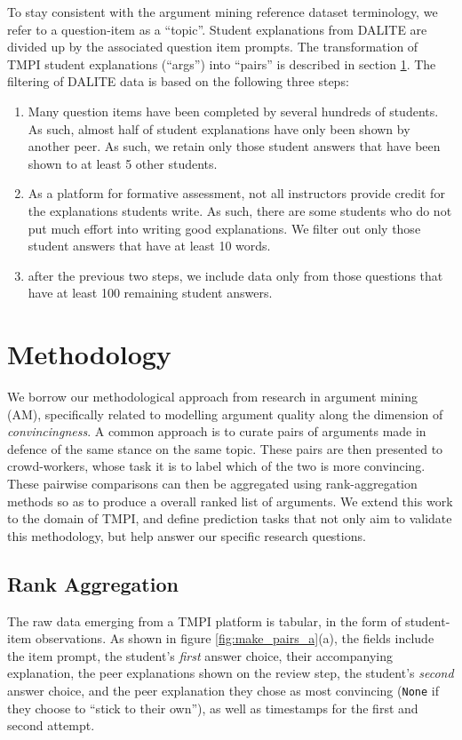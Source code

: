 \documentclass[notitlepage,12pt]{jedm}
\begin{document}
To stay consistent with the argument mining reference dataset terminology, we 
refer to a question-item as a ``topic''.
Student explanations from DALITE are divided up by the associated question item 
prompts.
The transformation of TMPI student explanations (``args'') into ``pairs'' is 
described in section \ref{sec:methodology}. 
The filtering of DALITE data is based on the following three steps:
\begin{enumerate}
	\item Many question items have been completed by several hundreds of 
	students. 
	As such, almost half of student explanations have only been shown by 
	another peer. 
	As such, we retain only those student answers that have been shown to at 
	least 5 other students.
	\item As a platform for formative assessment, not all instructors provide 
	credit for the explanations students write.
	As such, there are some students who do not put much effort into writing 
	good explanations.
	We filter out only those student answers that have at least 10 words.
	\item after the previous two steps, we include data only from those 
	questions that have at least 100 remaining student answers.
\end{enumerate}



\section{Methodology}\label{sec:methodology}

We borrow our methodological approach from research in argument mining (AM), 
specifically related to modelling argument quality along the dimension of 
\textit{convincingness}.
A common approach is to curate pairs of arguments made in defence of the same 
stance on the same topic.
These pairs are then presented to crowd-workers, whose task it is to label 
which of the two is more convincing. 
These pairwise comparisons can then be aggregated using rank-aggregation 
methods so as to produce a overall ranked list of arguments.
We extend this work to the domain of TMPI, and define prediction tasks that not 
only aim to validate this methodology, but help answer our specific research 
questions.

\subsection{Rank Aggregation}
The raw data emerging from a TMPI platform is tabular, in the form of 
student-item observations.
As shown in figure \ref{fig:make_pairs_a}(a), the fields include the item 
prompt, the student's \textit{first} answer choice, their accompanying 
explanation, the peer explanations shown on the review step, the student's 
\textit{second} answer choice, and the peer explanation they chose as most 
convincing (\verb|None| if they choose to ``stick to their own''), as well as 
timestamps for the first and second attempt.
\end{document}
